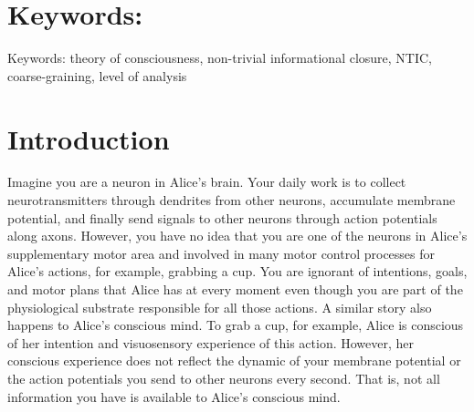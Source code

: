 \documentclass[utf8]{article}
\begin{document}
	\section*{Keywords:}
	Keywords: theory of consciousness, non-trivial informational closure, NTIC, coarse-graining, level of analysis


    \newpage
	\section{Introduction}

		Imagine you are a neuron in Alice's brain. Your daily work is to collect neurotransmitters through dendrites from other neurons, accumulate membrane potential, and finally send signals to other neurons through action potentials along axons. However, you have no idea that you are one of the neurons in Alice's supplementary motor area and involved in many motor control processes for Alice's actions, for example, grabbing a cup. You are ignorant of intentions, goals, and motor plans that Alice has at every moment even though you are part of the physiological substrate responsible for all those actions.
		A similar story also happens to Alice's conscious mind. To grab a cup, for example, Alice is conscious of her intention and visuosensory experience of this action. However, her conscious experience does not reflect the dynamic of your membrane potential or the action potentials you send to other neurons every second. That is, not all information you have is available to Alice's conscious mind.

		
\end{document}
